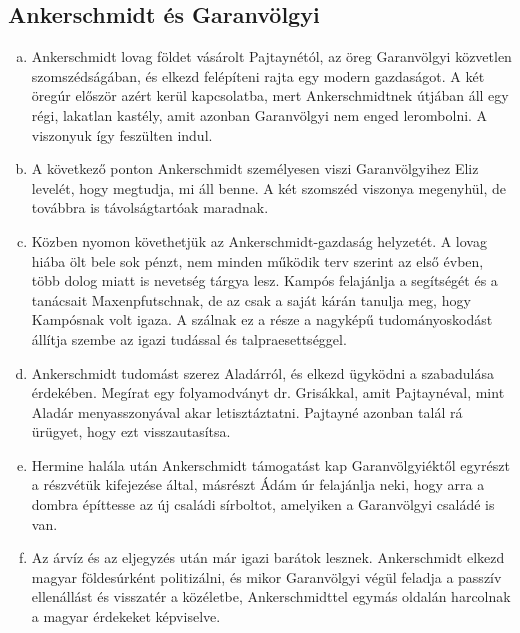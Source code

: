 \documentclass{thesis-ekf}
\begin{document}
    \subsection{Ankerschmidt és Garanvölgyi}

    \begin{enumerate}[a)]
        \item\label{itm:bekoltoznek} Ankerschmidt lovag földet vásárolt Pajtaynétól, az öreg Garanvölgyi közvetlen szomszédságában,
            és elkezd felépíteni rajta egy modern gazdaságot.
        A két öregúr először azért kerül kapcsolatba, mert Ankerschmidtnek útjában áll egy régi, lakatlan kastély,
            amit azonban Garanvölgyi nem enged lerombolni.
        A viszonyuk így feszülten indul.
        \item\label{itm:Eliz-levele} A következő ponton Ankerschmidt személyesen viszi Garanvölgyihez Eliz levelét, hogy megtudja, mi áll benne.
        A két szomszéd viszonya megenyhül, de továbbra is távolságtartóak maradnak.
        \item\label{itm:gazdasag} Közben nyomon követhetjük az Ankerschmidt-gazdaság helyzetét.
        A lovag hiába ölt bele sok pénzt, nem minden működik terv szerint az első évben, több dolog miatt is nevetség tárgya lesz.
        Kampós felajánlja a segítségét és a tanácsait Maxenpfutschnak, de az csak a saját kárán tanulja meg, 
            hogy Kampósnak volt igaza.
        A szálnak ez a része a nagyképű tudományoskodást állítja szembe az igazi tudással és talpraesettséggel.
        \item\label{itm:Aladarert} Ankerschmidt tudomást szerez Aladárról, és elkezd ügyködni a szabadulása érdekében.
        Megírat egy folyamodványt dr. Grisákkal, amit Pajtaynéval, mint Aladár menyasszonyával akar letisztáztatni.
        Pajtayné azonban talál rá ürügyet, hogy ezt visszautasítsa.
        \item\label{itm:sirbolt} Hermine halála után Ankerschmidt támogatást kap Garanvölgyiéktől egyrészt a részvétük kifejezése által,
            másrészt Ádám úr felajánlja neki, hogy arra a dombra építtesse az új családi sírboltot, 
            amelyiken a Garanvölgyi családé is van.
        \item\label{itm:politika} Az árvíz és az eljegyzés után már igazi barátok lesznek.
        Ankerschmidt elkezd magyar földesúrként politizálni, és mikor Garanvölgyi végül feladja a passzív ellenállást 
            és visszatér a közéletbe, Ankerschmidttel egymás oldalán harcolnak a magyar érdekeket képviselve.
    \end{enumerate}
    
\end{document}
